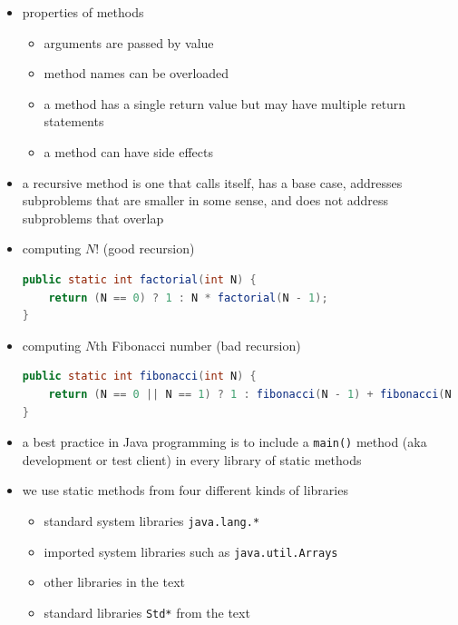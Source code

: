 \documentclass[8pt,a4paper,compress]{beamer}
\begin{document}
\begin{frame}[fragile]
\begin{itemize}
\item properties of methods
\begin{itemize}
\item arguments are passed by value
\item method names can be overloaded 
\item a method has a single return value but may have multiple return statements
\item a method can have side effects
\end{itemize}

\item a recursive method is one that calls itself, has a base case, addresses subproblems that are smaller in some sense, and does not address subproblems that overlap

\item computing $N!$ (good recursion)
\begin{lstlisting}[language=Java]
public static int factorial(int N) {
    return (N == 0) ? 1 : N * factorial(N - 1); 
}
\end{lstlisting}

\item computing $N$th Fibonacci number (bad recursion)
\begin{lstlisting}[language=Java]
public static int fibonacci(int N) {
    return (N == 0 || N == 1) ? 1 : fibonacci(N - 1) + fibonacci(N - 2); 
}
\end{lstlisting}
\end{itemize}
\end{frame}

\begin{frame}[fragile]
\begin{itemize}
\item a best practice in Java programming is to include a \lstinline{main()} method (aka development or test client) in every library of static methods

\item we use static methods from four different kinds of libraries
\begin{itemize}
\item standard system libraries \lstinline{java.lang.*}
\item imported system libraries such as \lstinline{java.util.Arrays}
\item other libraries in the text
\item standard libraries \lstinline{Std*} from the text
\end{itemize}
\end{itemize}
\end{frame}
\end{document}
